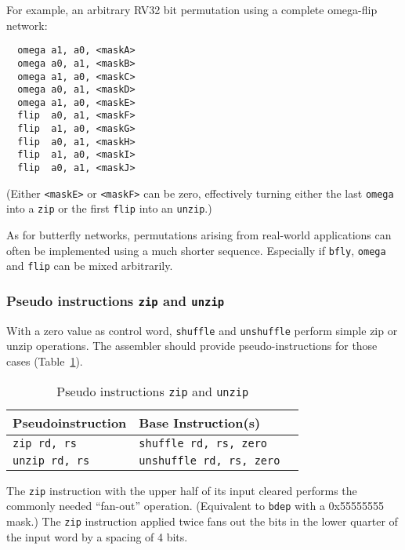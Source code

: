 For example, an arbitrary RV32 bit permutation using a complete omega-flip network:

\begin{verbatim}
  omega a1, a0, <maskA>
  omega a0, a1, <maskB>
  omega a1, a0, <maskC>
  omega a0, a1, <maskD>
  omega a1, a0, <maskE>
  flip  a0, a1, <maskF>
  flip  a1, a0, <maskG>
  flip  a0, a1, <maskH>
  flip  a1, a0, <maskI>
  flip  a0, a1, <maskJ>
\end{verbatim}

(Either {\tt <maskE>} or {\tt <maskF>} can be zero, effectively turning either
the last {\tt omega} into a {\tt zip} or the first {\tt flip} into an {\tt unzip}.)

As for butterfly networks, permutations arising from real-world applications
can often be implemented using a much shorter sequence. Especially if {\tt bfly},
{\tt omega} and {\tt flip} can be mixed arbitrarily.

\subsubsection{Pseudo instructions {\tt zip} and {\tt unzip}}

With a zero value as control word, {\tt shuffle} and {\tt unshuffle} perform
simple zip or unzip operations. The assembler should provide pseudo-instructions
for those cases (Table~\ref{pseudos-zip-unzip}).

\begin{table}[h]
\begin{small}
\begin{center}
\begin{tabular}{l l l}
Pseudoinstruction & Base Instruction(s) \\ \hline
{\tt zip rd, rs} & {\tt shuffle rd, rs, zero} \\
{\tt unzip rd, rs} & {\tt unshuffle rd, rs, zero} \\
\hline

\end{tabular}
\end{center}
\end{small}
\caption{Pseudo instructions {\tt zip} and {\tt unzip}}
\label{pseudos-zip-unzip}
\end{table}

The \texttt{zip} instruction with the upper half of its input cleared performs
the commonly needed ``fan-out'' operation. (Equivalent to {\tt bdep} with a
0x55555555 mask.) The \texttt{zip} instruction applied twice fans out the bits
in the lower quarter of the input word by a spacing of 4 bits.

